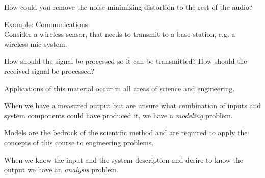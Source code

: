   How could you remove the noise minimizing distortion to the rest of the audio?

  Example: Communications\\
  
  Consider a wireless sensor, that needs to transmit to a base station, e.g. a wireless mic system. 
  \begin{center}
\end{center}

How should the signal be processed so it can be transmitted? How should the received signal be processed?

Applications of this material occur in all areas of science and engineering.

When we have a measured output but are unsure what combination of inputs and system components could have produced it, we have a {\it modeling} problem.

    \begin{center}
  \end{center}
  
   Models are the bedrock of the scientific method and are required to apply the concepts of this course to engineering problems. 

   When we know the input and the system description and desire to know the output we have an {\it analysis} problem. 

